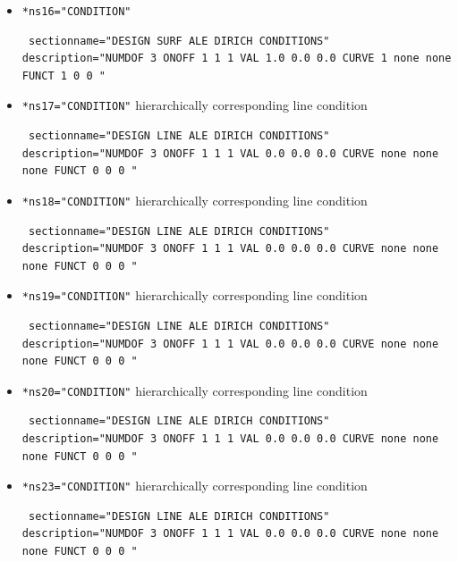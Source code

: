 \begin{itemize}
 \item \verb|*ns16="CONDITION"|
\begin{small} \begin{verbatim} sectionname="DESIGN SURF ALE DIRICH CONDITIONS"
description="NUMDOF 3 ONOFF 1 1 1 VAL 1.0 0.0 0.0 CURVE 1 none none FUNCT 1 0 0 "
\end{verbatim} \end{small}

 \item \verb|*ns17="CONDITION"| \qquad hierarchically corresponding line condition
\begin{small} \begin{verbatim} sectionname="DESIGN LINE ALE DIRICH CONDITIONS"
description="NUMDOF 3 ONOFF 1 1 1 VAL 0.0 0.0 0.0 CURVE none none none FUNCT 0 0 0 "
\end{verbatim} \end{small}

 \item \verb|*ns18="CONDITION"| \qquad hierarchically corresponding line condition
\begin{small} \begin{verbatim} sectionname="DESIGN LINE ALE DIRICH CONDITIONS"
description="NUMDOF 3 ONOFF 1 1 1 VAL 0.0 0.0 0.0 CURVE none none none FUNCT 0 0 0 "
\end{verbatim} \end{small}

 \item \verb|*ns19="CONDITION"| \qquad hierarchically corresponding line condition
\begin{small} \begin{verbatim} sectionname="DESIGN LINE ALE DIRICH CONDITIONS"
description="NUMDOF 3 ONOFF 1 1 1 VAL 0.0 0.0 0.0 CURVE none none none FUNCT 0 0 0 "
\end{verbatim} \end{small}

 \item \verb|*ns20="CONDITION"| \qquad hierarchically corresponding line condition
\begin{small} \begin{verbatim} sectionname="DESIGN LINE ALE DIRICH CONDITIONS"
description="NUMDOF 3 ONOFF 1 1 1 VAL 0.0 0.0 0.0 CURVE none none none FUNCT 0 0 0 "
\end{verbatim} \end{small}

\item \verb|*ns23="CONDITION"| \qquad hierarchically corresponding line condition
\begin{small} \begin{verbatim} sectionname="DESIGN LINE ALE DIRICH CONDITIONS"
description="NUMDOF 3 ONOFF 1 1 1 VAL 0.0 0.0 0.0 CURVE none none none FUNCT 0 0 0 "
\end{verbatim} \end{small}


\end{itemize}
